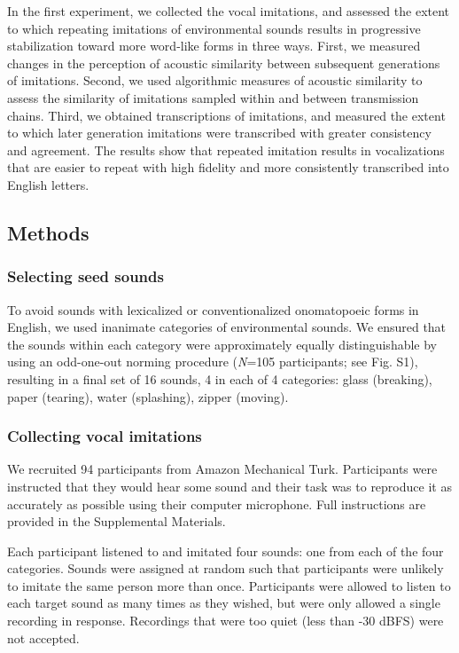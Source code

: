 \documentclass[english,floatsintext,man]{apa6}
\theoremstyle{definition}
\theoremstyle{definition}
\theoremstyle{definition}
\theoremstyle{remark}
\begin{document}
In the first experiment, we collected the vocal imitations, and assessed
the extent to which repeating imitations of environmental sounds results
in progressive stabilization toward more word-like forms in three ways.
First, we measured changes in the perception of acoustic similarity
between subsequent generations of imitations. Second, we used
algorithmic measures of acoustic similarity to assess the similarity of
imitations sampled within and between transmission chains. Third, we
obtained transcriptions of imitations, and measured the extent to which
later generation imitations were transcribed with greater consistency
and agreement. The results show that repeated imitation results in
vocalizations that are easier to repeat with high fidelity and more
consistently transcribed into English letters.

\hypertarget{methods}{%
\subsection{Methods}\label{methods}}

\hypertarget{selecting-seed-sounds}{%
\subsubsection{Selecting seed sounds}\label{selecting-seed-sounds}}

To avoid sounds with lexicalized or conventionalized onomatopoeic forms
in English, we used inanimate categories of environmental sounds. We
ensured that the sounds within each category were approximately equally
distinguishable by using an odd-one-out norming procedure (\emph{N}=105
participants; see Fig. S1), resulting in a final set of 16 sounds, 4 in
each of 4 categories: glass (breaking), paper (tearing), water
(splashing), zipper (moving).

\hypertarget{collecting-vocal-imitations}{%
\subsubsection{Collecting vocal
imitations}\label{collecting-vocal-imitations}}

We recruited 94 participants from Amazon Mechanical Turk. Participants
were instructed that they would hear some sound and their task was to
reproduce it as accurately as possible using their computer microphone.
Full instructions are provided in the Supplemental Materials.

Each participant listened to and imitated four sounds: one from each of
the four categories. Sounds were assigned at random such that
participants were unlikely to imitate the same person more than once.
Participants were allowed to listen to each target sound as many times
as they wished, but were only allowed a single recording in response.
Recordings that were too quiet (less than -30 dBFS) were not accepted.
\end{document}
